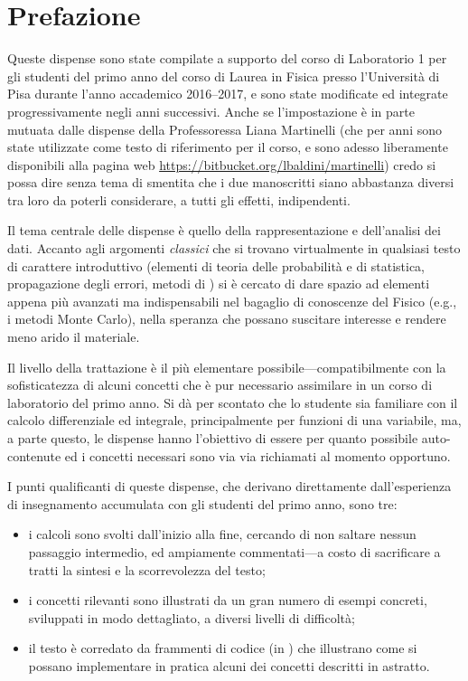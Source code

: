\chapter*{Prefazione}

Queste dispense sono state compilate a supporto del corso di Laboratorio 1
per gli studenti del primo anno del corso di Laurea in Fisica presso
l'Università di Pisa durante l'anno accademico 2016--2017, e sono state modificate
ed integrate progressivamente negli anni successivi.
Anche se l'impostazione è in parte mutuata dalle dispense della Professoressa
Liana Martinelli (che per anni sono state utilizzate come testo di riferimento
per il corso, e sono adesso liberamente disponibili alla pagina web
\url{https://bitbucket.org/lbaldini/martinelli}) credo si possa dire
senza tema di smentita che i due manoscritti siano abbastanza diversi tra loro
da poterli considerare, a tutti gli effetti, indipendenti.

Il tema centrale delle dispense è quello della rappresentazione e dell'analisi
dei dati. Accanto agli argomenti \emph{classici} che si trovano virtualmente in
qualsiasi testo di carattere introduttivo (elementi di teoria delle probabilità
e di statistica, propagazione degli errori, metodi di \fit) si è cercato di dare
spazio ad elementi appena più avanzati ma indispensabili nel bagaglio di
conoscenze del Fisico (e.g., i metodi Monte Carlo), nella speranza che possano
suscitare interesse e rendere meno arido il materiale.

Il livello della trattazione è il più elementare possibile---compatibilmente
con la sofisticatezza di alcuni concetti che è pur necessario assimilare
in un corso di laboratorio del primo anno. Si dà per scontato che lo studente
sia familiare con il calcolo differenziale ed integrale, principalmente
per funzioni di una variabile, ma, a parte questo, le dispense hanno
l'obiettivo di essere per quanto possibile auto-contenute ed i concetti
necessari sono via via richiamati al momento opportuno.

I punti qualificanti di queste dispense, che derivano direttamente
dall'esperienza di insegnamento accumulata con gli studenti del primo anno,
sono tre:
\begin{itemize}
\item i calcoli sono svolti dall'inizio alla fine, cercando di non saltare
  nessun passaggio intermedio, ed ampiamente commentati---a costo di
  sacrificare a tratti la sintesi e la scorrevolezza del testo;
\item i concetti rilevanti sono illustrati da un gran numero di esempi
  concreti, sviluppati in modo dettagliato, a diversi livelli di
  difficoltà;
\item il testo è corredato da frammenti di codice (in \python) che illustrano
  come si possano implementare in pratica alcuni dei concetti descritti
  in astratto.
\end{itemize}

